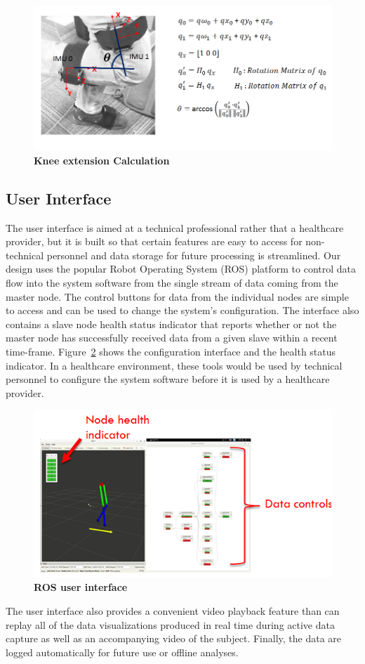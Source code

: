 \documentclass[conference]{IEEEtran}
\begin{document}
\begin{figure}[h]
  \centering
  \includegraphics[width=0.99\columnwidth]{figs/knees2}
  \caption{{\bf Knee extension Calculation}}
  \label{fig:knees}
\end{figure}

\subsection{User Interface}
The user interface is aimed at a technical professional rather that a healthcare provider,
but it is built so that certain features are easy to access for non-technical personnel
and data storage for future processing is streamlined. Our design uses the popular Robot
Operating System (ROS) platform to control data flow into the system software from the
single stream of data coming from the master node. The control buttons for data from the
individual nodes are simple to access and can be used to change the system's
configuration. The interface also contains a slave node health status indicator that
reports whether or not the master node has successfully received data from a given slave
within a recent time-frame. Figure~\ref{fig:ROS} shows the configuration interface and the
health status indicator. In a healthcare environment, these tools would be used by
technical personnel to configure the system software before it is used by a healthcare
provider. 

\begin{figure}[h]
  \centering
  \includegraphics[width=\columnwidth]{figs/gui}
  \caption{{\bf ROS user interface}}
  \label{fig:ROS}
\end{figure}
The user interface also provides a convenient video playback feature than can replay all
of the data visualizations produced in real time during active data capture as well as an
accompanying video of the subject. Finally, the data are logged automatically for future
use or offline analyses. 
\end{document}
